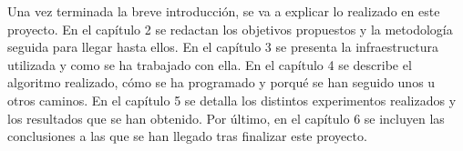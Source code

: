 


\hspace{1 cm} Una vez terminada la breve introducci\'on, se va a explicar lo realizado en este proyecto. En el cap\'itulo 2 se redactan los objetivos propuestos y la metodolog\'ia seguida para llegar hasta ellos. En el cap\'itulo 3 se presenta la infraestructura utilizada y como se ha trabajado con ella. En el cap\'itulo 4 se describe el algoritmo realizado, c\'omo se ha programado y porqu\'e se han seguido unos u otros caminos. En el cap\'itulo 5 se detalla los distintos experimentos realizados y los resultados que se han obtenido. Por \'ultimo, en el cap\'itulo 6 se incluyen las conclusiones a las que se han llegado tras finalizar este proyecto.










